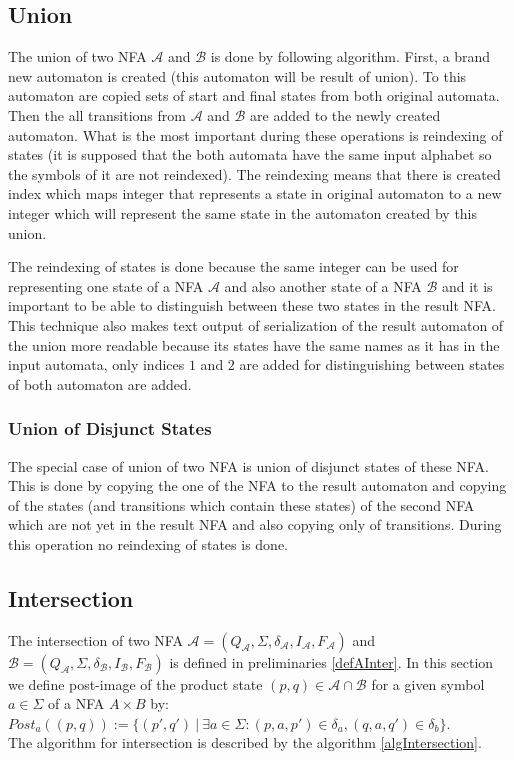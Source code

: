 \subsection{Union}
The union of two NFA $\mathcal{A}$ and $\mathcal{B}$ is done by following algorithm. First, a brand new automaton is created (this automaton
will be result of union). To this automaton are copied sets of start and final states from both original automata. Then the all transitions from $\mathcal{A}$ and
$\mathcal{B}$ are added to the newly created automaton. What is the most important during these operations is reindexing of states (it is supposed
that the both automata have the same input alphabet so the symbols of it are not reindexed). The reindexing means that there is created index which maps
integer that represents a state in original automaton to a new integer which will represent the same state in the automaton created by this union.

The reindexing of states is done because the same integer can be used for representing one state of a NFA $\mathcal{A}$ 
and also another state of a NFA $\mathcal{B}$ and it is important
to be able to distinguish between these two states in the result NFA. This technique also makes text output of serialization of the result automaton of 
the union more readable because its states have the same names as it has in the input automata, only indices $1$ and $2$ are added for 
distinguishing between states of both automaton are added.

\subsubsection{Union of Disjunct States}
The special case of union of two NFA is union of disjunct states of these NFA. This is done by copying the one of the NFA to the result automaton and
copying of the states (and transitions which contain these states) of the second NFA which are not yet in the result NFA and also copying only of transitions.
During this operation no reindexing of states is done.

\subsection{Intersection}
The intersection of two NFA $\mathcal{A}=(Q_\mathcal{A},\Sigma,\delta_\mathcal{A},I_\mathcal{A},F_\mathcal{A})$
and $\mathcal{B}=(Q_\mathcal{A},\Sigma,\delta_\mathcal{B},I_\mathcal{B},F_\mathcal{B})$ is defined 
in preliminaries \ref{defAInter}. 
In this section we define post-image of the product state $(p,q)\in \mathcal{A}\cap\mathcal{B}$ for a given symbol $a\in \Sigma$ of a NFA $A\times B$ by:\\
$Post_a((p,q)):=\{(p',q')\ |\ \exists a \in \Sigma: (p,a,p')\in \delta_a, (q,a,q')\in \delta_b\}$.\\
The algorithm for intersection is described by the algorithm \ref{algIntersection}.

